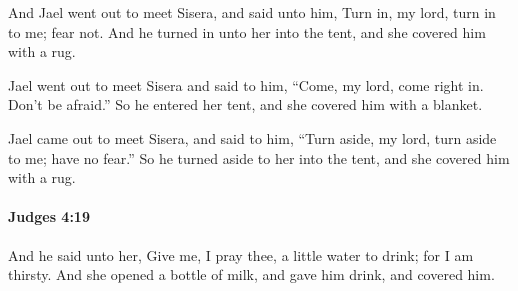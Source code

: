 			\begin{versebox}
					\item[BHS] 
					\item[ASV] And Jael went out to meet Sisera, and said unto him, Turn in, my lord, turn in to me; fear not. And he turned in unto her into the tent, and she covered him with a rug.
					\item[NIV] Jael went out to meet Sisera and said to him, “Come, my lord, come right in. Don’t be afraid.” So he entered her tent, and she covered him with a blanket.
					\item[NRSV] Jael came out to meet Sisera, and said to him, “Turn aside, my lord, turn aside to me; have no fear.” So he turned aside to her into the tent, and she covered him with a rug.
			\end{versebox}

		\paragraph{Judges 4:19} %
			\label{JUDGES-4-19}

			And he said unto her, Give me, I pray thee, a little water to drink; for I am thirsty. And she opened a bottle of milk, and gave him drink, and covered him.

